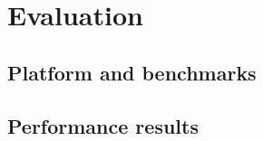 

\section{Evaluation}
\label{s:evaluation}

\subsection{Platform and benchmarks}


\subsection{Performance results }


